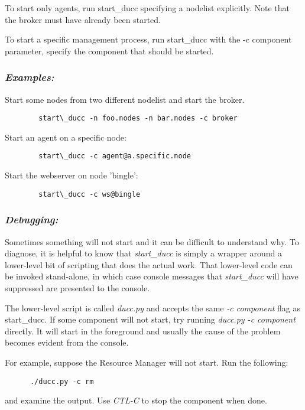       To start only agents, run start\_ducc specifying a nodelist explicitly. Note that the broker
      must have already been started.
      
      To start a specific management process, run start\_ducc with the -c component parameter, 
      specify the component that should be started. 
      
      \subsubsection{{\em Examples: }}

      Start some nodes from two different nodelist and start the broker.  
\begin{verbatim}
        start\_ducc -n foo.nodes -n bar.nodes -c broker
\end{verbatim}
                  
      Start an agent on a specific node: 
\begin{verbatim}
        start\_ducc -c agent@a.specific.node 
\end{verbatim}
      
      Start the webserver on node 'bingle': 
\begin{verbatim}
        start\_ducc -c ws@bingle 
\end{verbatim}

      \subsubsection{{\em Debugging:}}

      Sometimes something will not start and it can be difficult to understand why.  To diagnose, it is
      helpful to know that {\em start\_ducc} is simply a wrapper around a lower-level bit of scripting
      that does the actual work.  That lower-level code can be invoked stand-alone, in which case
      console messages that {\em start\_ducc} will have suppressed are presented to the console.

      The lower-level script is called {\em ducc.py} and accepts the same {\em -c component} flag as
      start\_ducc.  If some component will not start, try running {\em ducc.py -c component} directly.
      It will start in the foreground and usually the cause of the problem becomes evident from
      the console.

      For example, suppose the Resource Manager will not start.  Run the following:
\begin{verbatim}
      ./ducc.py -c rm
\end{verbatim}
      and examine the output.  Use {\em CTL-C} to stop the component when done.
      

